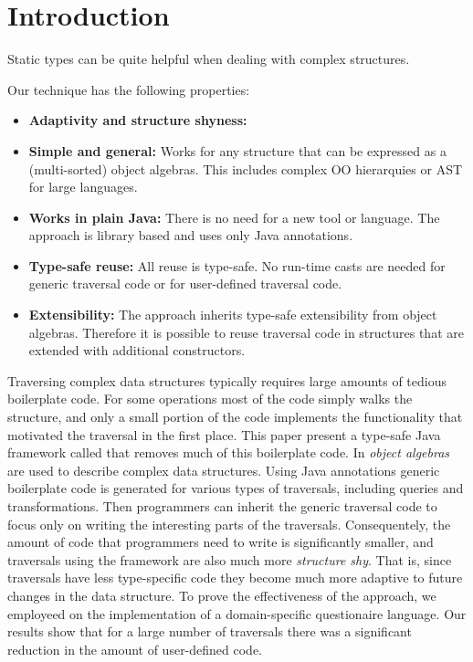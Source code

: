 \section{Introduction}

Static types can be quite helpful when dealing with complex structures.

Our technique has the following properties:

\begin{itemize}

\item {\bf Adaptivity and structure shyness:}

\item {\bf Simple and general:} Works for any structure that can be expressed 
as a (multi-sorted) object algebras. This includes complex OO hierarquies
or AST for large languages. 

\item {\bf Works in plain Java:} There is no need for a new tool or language. 
The approach is library based and uses only Java annotations. 

\item {\bf Type-safe reuse:}   All reuse is type-safe. No run-time
  casts are needed for generic traversal code or for user-defined 
  traversal code. 

\item {\bf Extensibility:} The approach inherits type-safe
  extensibility from object algebras. Therefore it is possible to
  reuse traversal code in structures that are extended with additional
  constructors.

\end{itemize}

Traversing complex data structures typically requires large amounts of
tedious boilerplate code. For some operations most of the code simply
walks the structure, and only a small portion of the code implements
the functionality that motivated the traversal in the first place.
This paper present a type-safe Java framework called \name that
removes much of this boilerplate code. In \name \emph{object algebras}
are used to describe complex data structures. Using Java annotations
generic boilerplate code is generated for various types of traversals,
including queries and transformations. Then programmers can inherit
the generic traversal code to focus only on writing the interesting
parts of the traversals. Consequentely, the amount of code that
programmers need to write is significantly smaller, and traversals
using the \name framework are also much more \emph{structure
  shy}. That is, since traversals have less type-specific code they
become much more adaptive to future changes in the data structure.
To prove the effectiveness of the approach, we employeed \name 
on the implementation of a domain-specific questionaire 
language. Our results show that for a large number of traversals 
there was a significant reduction in the amount of user-defined code.

